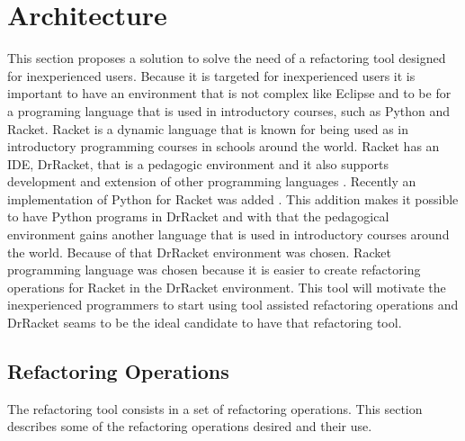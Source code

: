 
% 
% 

\section{Architecture}

This section proposes a solution to solve the need of a refactoring tool designed for inexperienced users.
Because it is targeted for inexperienced users it is important to have an environment that is not complex like Eclipse and to be for a programing language that is used in introductory courses, such as Python and Racket.
Racket is a dynamic language that is known for being used as in introductory programming courses in schools around the world. 
Racket has an IDE, DrRacket, that is a pedagogic environment \cite{drscheme_pegadogy} and it also supports development and extension of other programming languages \cite{tobin2011languages}. 
Recently  an implementation of Python for Racket was added \cite{ramos2014implementation}. 
This addition makes it possible to have Python programs in DrRacket and with that the pedagogical environment gains another language that is used in introductory courses around the world. Because of that DrRacket environment was chosen. 
Racket programming language was chosen because it is easier to create refactoring operations for Racket in the DrRacket environment.
This tool will motivate the inexperienced programmers to start using tool assisted refactoring operations and DrRacket seams to be the ideal candidate to have that refactoring tool.


\subsection{Refactoring Operations}
The refactoring tool consists in a set of refactoring operations.
This section describes some of the refactoring operations desired and their use.

